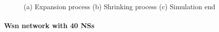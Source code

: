 \begin{figure}[H]
    \centering
    \caption{(a) Expansion process (b) Shrinking process (c) Simulation end}
    \label{fig:foobar}
\end{figure}

\paragraph{Wsn network with 40 NSs}

